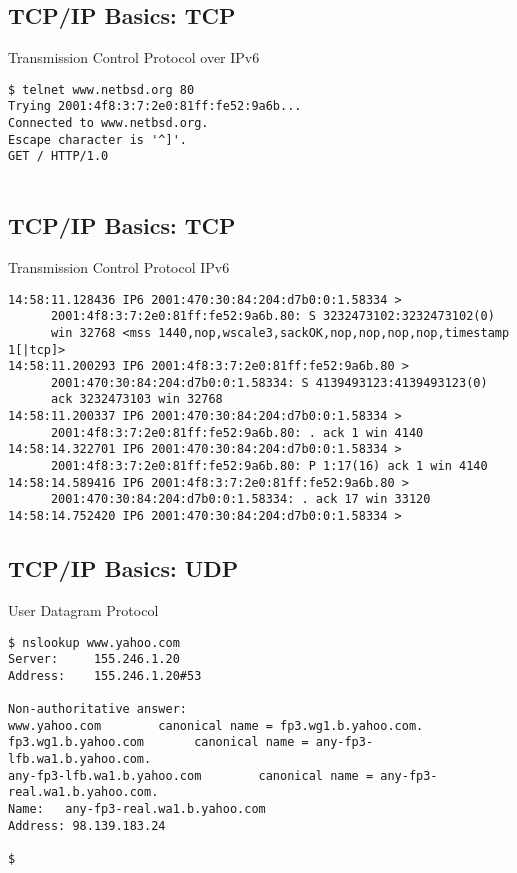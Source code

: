 \documentclass[xga]{xdvislides}
\begin{document}
\subsection{TCP/IP Basics: TCP}
\begin{center}
Transmission Control Protocol over IPv6
\end{center}
\vspace{.2in}
\begin{verbatim}
$ telnet www.netbsd.org 80
Trying 2001:4f8:3:7:2e0:81ff:fe52:9a6b...
Connected to www.netbsd.org.
Escape character is '^]'.
GET / HTTP/1.0


\end{verbatim}

\subsection{TCP/IP Basics: TCP}
\begin{center}
Transmission Control Protocol IPv6
\end{center}
\vspace{.2in}
\begin{verbatim}
14:58:11.128436 IP6 2001:470:30:84:204:d7b0:0:1.58334 >
      2001:4f8:3:7:2e0:81ff:fe52:9a6b.80: S 3232473102:3232473102(0)
      win 32768 <mss 1440,nop,wscale3,sackOK,nop,nop,nop,nop,timestamp 1[|tcp]>
14:58:11.200293 IP6 2001:4f8:3:7:2e0:81ff:fe52:9a6b.80 >
      2001:470:30:84:204:d7b0:0:1.58334: S 4139493123:4139493123(0)
      ack 3232473103 win 32768
14:58:11.200337 IP6 2001:470:30:84:204:d7b0:0:1.58334 >
      2001:4f8:3:7:2e0:81ff:fe52:9a6b.80: . ack 1 win 4140
14:58:14.322701 IP6 2001:470:30:84:204:d7b0:0:1.58334 >
      2001:4f8:3:7:2e0:81ff:fe52:9a6b.80: P 1:17(16) ack 1 win 4140
14:58:14.589416 IP6 2001:4f8:3:7:2e0:81ff:fe52:9a6b.80 >
      2001:470:30:84:204:d7b0:0:1.58334: . ack 17 win 33120
14:58:14.752420 IP6 2001:470:30:84:204:d7b0:0:1.58334 >
\end{verbatim}


\subsection{TCP/IP Basics: UDP}
\begin{center}
User Datagram Protocol
\end{center}
\vspace{.2in}
\begin{verbatim}
$ nslookup www.yahoo.com
Server:		155.246.1.20
Address:	155.246.1.20#53

Non-authoritative answer:
www.yahoo.com        canonical name = fp3.wg1.b.yahoo.com.
fp3.wg1.b.yahoo.com       canonical name = any-fp3-lfb.wa1.b.yahoo.com.
any-fp3-lfb.wa1.b.yahoo.com        canonical name = any-fp3-real.wa1.b.yahoo.com.
Name:	any-fp3-real.wa1.b.yahoo.com
Address: 98.139.183.24

$
\end{verbatim}
\end{document}
